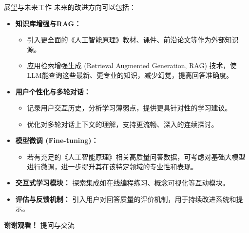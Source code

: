 \documentclass{beamer}
\begin{document}
\begin{frame}{展望与未来工作}
  未来的改进方向可以包括：
  \begin{itemize}
    \item \textbf{知识库增强与RAG：}
        \begin{itemize}
            \item 引入更全面的《人工智能原理》教材、课件、前沿论文等作为外部知识源。
            \item 应用检索增强生成 (Retrieval Augmented Generation, RAG) 技术，使LLM能查询这些最新、更专业的知识，减少幻觉，提高回答准确度。
        \end{itemize}
    \item \textbf{用户个性化与多轮对话：}
        \begin{itemize}
            \item 记录用户交互历史，分析学习薄弱点，提供更具针对性的学习建议。
            \item 优化对多轮对话上下文的理解，支持更流畅、深入的连续探讨。
        \end{itemize}
    \item \textbf{模型微调 (Fine-tuning)：}
        \begin{itemize}
            \item 若有充足的《人工智能原理》相关高质量问答数据，可考虑对基础大模型进行微调，进一步提升其在该特定领域的专业性和表现。
        \end{itemize}
    \item \textbf{交互式学习模块：} 探索集成如在线编程练习、概念可视化等互动模块。
    \item \textbf{评估与反馈机制：} 引入用户对回答质量的评价机制，用于持续改进系统和提示。
  \end{itemize}
\end{frame}


\begin{frame}
  \centering
  {\Huge \bfseries 谢谢观看！}
  \vfill
  \Large 提问与交流
\end{frame}
\end{document}
